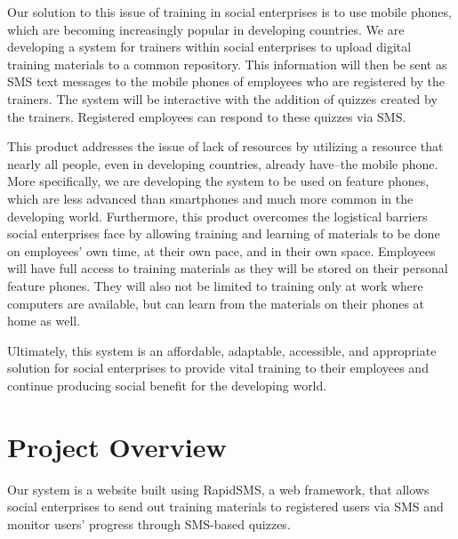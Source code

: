 Our solution to this issue of training in social enterprises is to use mobile phones, which are becoming increasingly popular in developing countries. We are developing a system for trainers within social enterprises to upload digital training materials to a common repository. This information will then be sent as SMS text messages to the mobile phones of employees who are registered by the trainers. The system will be interactive with the addition of quizzes created by the trainers. Registered employees can respond to these quizzes via SMS. 

This product addresses the issue of lack of resources by utilizing a resource that nearly all people, even in developing countries, already have--the mobile phone. More specifically, we are developing the system to be used on feature phones, which are less advanced than smartphones and much more common in the developing world. Furthermore, this product overcomes the logistical barriers social enterprises face by allowing training and learning of materials to be done on employees’ own time, at their own pace, and in their own space. Employees will have full access to training materials as they will be stored on their personal feature phones. They will also not be limited to training only at work where computers are available, but can learn from the materials on their phones at home as well. 

Ultimately, this system is an affordable, adaptable, accessible, and appropriate solution for social enterprises to provide vital training to their employees and continue producing social benefit for the developing world.


\section{Project Overview}
Our system is a website built using RapidSMS, a web framework, that allows social enterprises to send out training materials to registered users via SMS and monitor users’ progress through SMS-based quizzes.
